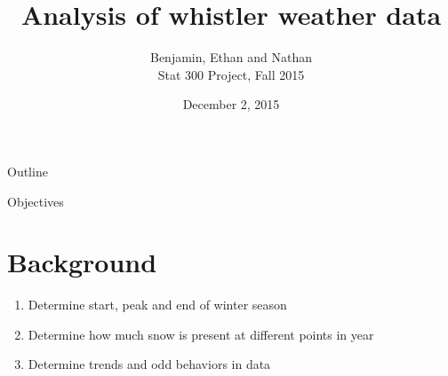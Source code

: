 \documentclass{beamer}
\begin{document}
\title{Analysis of whistler weather data}
\author{Benjamin, Ethan and Nathan \\ \vspace{1mm}
Stat 300 Project, Fall 2015}
\date{December 2, 2015}

\begin{frame}
\titlepage
\end{frame}

\begin{frame}{Outline}

\color{black}{
\tableofcontents}
\end{frame}

\begin{frame}{Objectives}

\section{Background}

\begin{enumerate}
\item Determine start, peak and end of winter season
\item Determine how much snow is present at different points in year
\item Determine trends and odd behaviors in data
\end{enumerate}

\end{frame}
\end{document}

